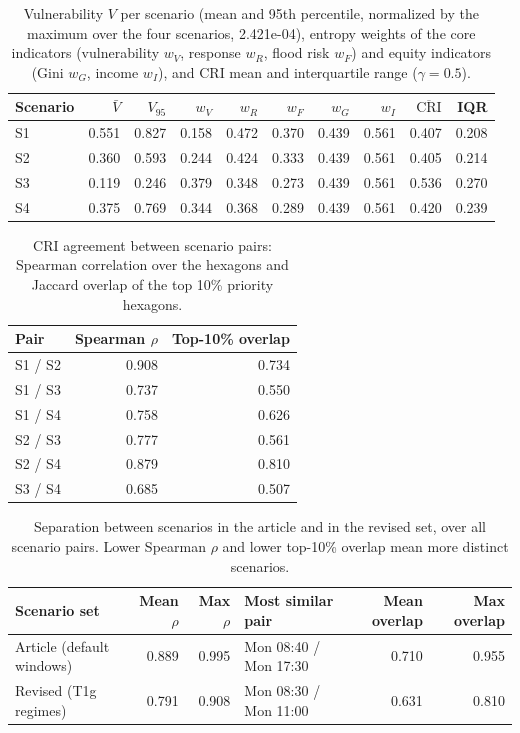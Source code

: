 \begin{table}[htbp]
\centering
\small
\caption{Vulnerability $V$ per scenario (mean and 95th percentile, normalized by the maximum over the four scenarios, 2.421e-04), entropy weights of the core indicators (vulnerability $w_V$, response $w_R$, flood risk $w_F$) and equity indicators (Gini $w_G$, income $w_I$), and CRI mean and interquartile range ($\gamma = 0.5$).}
\label{tab:vulnerability-cri}
\begin{tabular}{lrrrrrrrrr}
\toprule
Scenario & $\bar{V}$ & $V_{95}$ & $w_V$ & $w_R$ & $w_F$ & $w_G$ & $w_I$ & $\overline{\mathrm{CRI}}$ & IQR \\
\midrule
S1 & 0.551 & 0.827 & 0.158 & 0.472 & 0.370 & 0.439 & 0.561 & 0.407 & 0.208 \\
S2 & 0.360 & 0.593 & 0.244 & 0.424 & 0.333 & 0.439 & 0.561 & 0.405 & 0.214 \\
S3 & 0.119 & 0.246 & 0.379 & 0.348 & 0.273 & 0.439 & 0.561 & 0.536 & 0.270 \\
S4 & 0.375 & 0.769 & 0.344 & 0.368 & 0.289 & 0.439 & 0.561 & 0.420 & 0.239 \\
\bottomrule
\end{tabular}
\end{table}

\begin{table}[htbp]
\centering
\small
\caption{CRI agreement between scenario pairs: Spearman correlation over the hexagons and Jaccard overlap of the top 10\% priority hexagons.}
\label{tab:scenario-pairs}
\begin{tabular}{lrr}
\toprule
Pair & Spearman $\rho$ & Top-10\% overlap \\
\midrule
S1 / S2 & 0.908 & 0.734 \\
S1 / S3 & 0.737 & 0.550 \\
S1 / S4 & 0.758 & 0.626 \\
S2 / S3 & 0.777 & 0.561 \\
S2 / S4 & 0.879 & 0.810 \\
S3 / S4 & 0.685 & 0.507 \\
\bottomrule
\end{tabular}
\end{table}

\begin{table}[htbp]
\centering
\small
\caption{Separation between scenarios in the article and in the revised set, over all scenario pairs. Lower Spearman $\rho$ and lower top-10\% overlap mean more distinct scenarios.}
\label{tab:article-vs-revised}
\begin{tabular}{lrrlrr}
\toprule
Scenario set & Mean $\rho$ & Max $\rho$ & Most similar pair & Mean overlap & Max overlap \\
\midrule
Article (default windows) & 0.889 & 0.995 & Mon 08:40 / Mon 17:30 & 0.710 & 0.955 \\
Revised (T1g regimes) & 0.791 & 0.908 & Mon 08:30 / Mon 11:00 & 0.631 & 0.810 \\
\bottomrule
\end{tabular}
\end{table}

